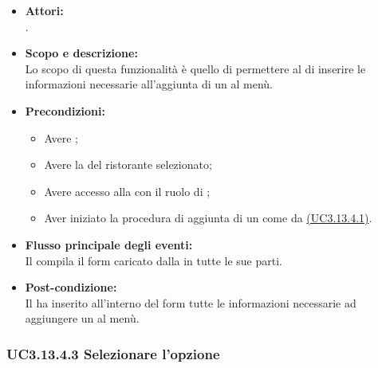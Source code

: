 \begin{itemize}
	\item \textbf{Attori:}
	\\.
	\item \textbf{Scopo e descrizione:} 
	\\Lo scopo di questa funzionalità è quello di permettere al  di inserire le informazioni necessarie all'aggiunta di un  al menù.
	\item \textbf{Precondizioni:}
	\begin{itemize}
		\item Avere ;
		\item Avere la  del ristorante selezionato;
		\item Avere accesso alla  con il ruolo di ;
		\item Aver iniziato la procedura di aggiunta di un  come da \hyperref[UC3.13.4.1]{(UC3.13.4.1)}.
	\end{itemize}
	\item \textbf{Flusso principale degli eventi:}
	\\Il {} compila il form caricato dalla  in tutte le sue parti.
	\item \textbf{Post-condizione:}
	\\Il {} ha inserito all'interno del form tutte le informazioni necessarie ad aggiungere un  al menù.
\end{itemize}

\subsubsection{UC3.13.4.3 Selezionare l'opzione } \label{UC3.13.4.3}

